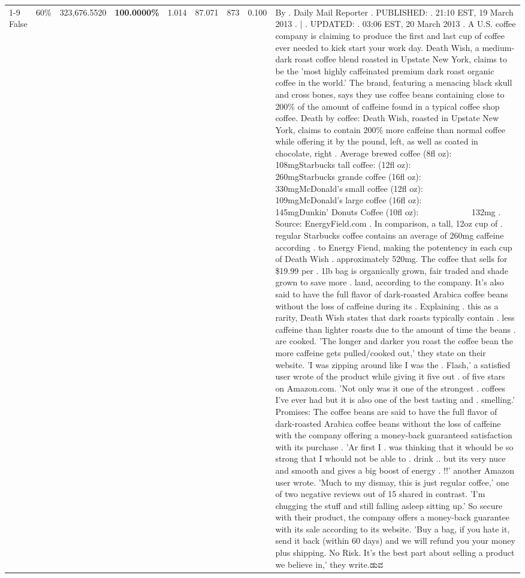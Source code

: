 \begin{table}[H]
{\begin{tabular}{lllrlllll}
\cline{1-9} \cline{2-9}
False & 60\% & 323,676.5520 & \bfseries \color{red} 100.0000\% & 1.014 & 87.071 & 873 & 0.100 & By . Daily Mail Reporter . PUBLISHED: . 21:10 EST, 19 March 2013 . | . UPDATED: . 03:06 EST, 20 March 2013 . A U.S. coffee company is claiming to produce the first and last cup of coffee ever needed to kick start your work day. Death Wish, a medium-dark roast coffee blend roasted in Upstate New York, claims to be the 'most highly caffeinated premium dark roast organic coffee in the world.' The brand, featuring a menacing black skull and cross bones, says they use coffee beans containing close to 200\% of the amount of caffeine found in a typical coffee shop coffee. Death by coffee: Death Wish, roasted in Upstate New York, claims to contain 200\% more caffeine than normal coffee while offering it by the pound, left, as well as coated in chocolate, right . Average brewed coffee (8fl oz):              108mgStarbucks tall coffee: (12fl oz):                260mgStarbucks grande coffee (16fl oz):         330mgMcDonald's small coffee (12fl oz):           109mgMcDonald's large coffee (16fl oz):           145mgDunkin' Donuts Coffee (10fl oz):             132mg . Source: EnergyField.com . In comparison, a tall, 12oz cup of . regular Starbucks coffee contains an average of 260mg caffeine according . to Energy Fiend, making the potentency in each cup of Death Wish . approximately 520mg. The coffee that sells for \$19.99 per . 1lb bag is organically grown, fair traded and shade grown to save more . land, according to the company. It's also said to have the full flavor of dark-roasted Arabica coffee beans without the loss of caffeine during its . Explaining . this as a rarity, Death Wish states that dark roasts typically contain . less caffeine than lighter roasts due to the amount of time the beans . are cooked. 'The longer and darker you roast the coffee bean the more caffeine gets pulled/cooked out,' they state on their website. 'I was zipping around like I was the . Flash,' a satisfied user wrote of the product while giving it five out . of five stars on Amazon.com. 'Not only was it one of the strongest . coffees I've ever had but it is also one of the best tasting and . smelling.’ Promises: The coffee beans are said to have the full flavor of dark-roasted Arabica coffee beans without the loss of caffeine with the company offering a money-back guaranteed satisfaction with its purchase . 'Ar first I . was thinking that it whould be so strong that I whould not be able to . drink .. but its very nuce and smooth and gives a big boost of energy . !!' another Amazon user wrote. 'Much to my dismay, this is just regular coffee,' one of two negative reviews out of 15 shared in contrast. 'I'm chugging the stuff and still falling asleep sitting up.' So secure with their product, the company offers a money-back guarantee with its sale according to its website. 'Buy a bag, if you hate it, send it back (within 60 days) and we will refund you your money plus shipping. No Risk. It’s the best part about selling a product we believe in,' they write.ಡುವ \\

\end{tabular}}
\end{table}
